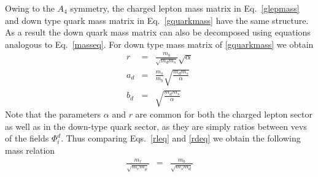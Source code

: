 \documentclass[english,10pt,aps,prd,a4paper,preprintnumbers,floatfix,nofootinbib,showpacs,superscriptaddress]{revtex4-1}
\begin{document}
Owing to the $A_4$ symmetry, the charged lepton mass matrix in
Eq.~\ref{glepmass} and down type quark mass matrix in
Eq.~\ref{gquarkmass} have the same structure. As a result the down
quark mass matrix can also be decomposed using equations analogous to
Eq.~\ref{masseq}. For down type mass matrix of \ref{gquarkmass} we
obtain
\begin{eqnarray}
r & = & \frac{m_b}{\sqrt{m_d m_s}} \sqrt{\alpha}  \label{rdeq} \\
a_d & = & \frac{m_s}{m_b} \sqrt{\frac{m_d m_s}{\alpha}}  \label{adeq} \\
b_d & = & \sqrt{\frac{m_d m_s}{\alpha}}  \label{bdeq}
\end{eqnarray}
 Note that the parameters $\alpha$ and $r$ are common for both the
 charged lepton sector as well as in the down-type quark sector, as
 they are simply ratios between vevs of the fields $\Phi^d_i$. Thus
 comparing Eqs.~\ref{rleq} and \ref{rdeq} we obtain the following mass
 relation
   \begin{eqnarray} \label{massrelation}
\frac{m_\tau}{\sqrt{m_e m_\mu}} & =  & \frac{m_b}{\sqrt{m_s m_d}}
  \end{eqnarray}
 
\end{document}
